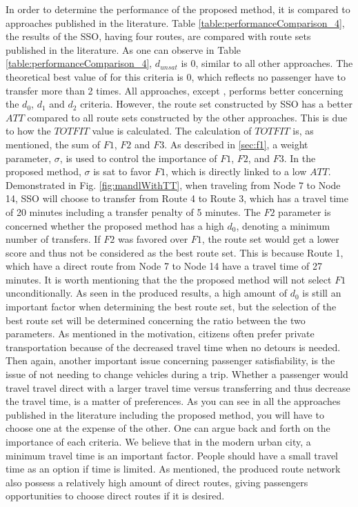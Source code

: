 In order to determine the performance of the proposed method, it is compared to approaches published in the literature. Table \vref{table:performanceComparison_4}, the results of the SSO, having four routes, are compared with route sets published in the literature. As one can observe in Table \vref{table:performanceComparison_4},  $d_{unsat}$ is 0, similar to all other approaches. The theoretical best value of for this criteria is 0, which reflects no passenger have to transfer more than 2 times. All approaches, except \citep{mandl79, kidwai98, chakroborty02}, performs better concerning the $d_0$, $d_1$ and $d_2$ criteria. However, the route set constructed by SSO has a better $ATT$ compared to all route sets constructed by the other approaches. This is due to how the $TOTFIT$ value is calculated. The calculation of $TOTFIT$ is, as mentioned, the sum of $F1$, $F2$ and $F3$. As described in \vref{sec:f1}, a weight parameter, $\sigma$, is used to control the importance of $F1$, $F2$, and $F3$. In the proposed method, $\sigma$ is sat to favor $F1$, which is directly linked to a low $ATT$. Demonstrated in Fig. \vref{fig:mandlWithTT}, when traveling from Node 7 to Node 14, SSO will choose to transfer from Route 4 to Route 3, which has a travel time of 20 minutes including a transfer penalty of 5 minutes. The $F2$ parameter is concerned whether the proposed method has a high $d_0$, denoting a minimum number of transfers. If $F2$ was favored over $F1$, the route set would get a lower score and thus not be considered as the best route set. This is because Route 1, which have a direct route from Node 7 to Node 14 have a travel time of 27 minutes. It is worth mentioning that the the proposed method will not select $F1$ unconditionally. As seen in the produced results, a high amount of $d_0$ is still an important factor when determining the best route set, but the selection of the best route set will be determined concerning the ratio between the two parameters. As mentioned in the motivation, citizens often prefer private transportation because of the decreased travel time when no detours is needed. Then again, another important issue concerning passenger satisfiability, is the issue of not needing to change vehicles during a trip. Whether a passenger would travel travel direct with a larger travel time versus transferring and thus decrease the travel time, is a matter of preferences. As you can see in all the approaches published in the literature including the proposed method, you will have to choose one at the expense of the other. One can argue back and forth on the importance of each criteria. We believe that in the modern urban city, a minimum travel time is an important factor. People should have a small travel time as an option if time is limited. As mentioned, the produced route network also possess a relatively high amount of direct routes, giving passengers opportunities to choose direct routes if it is desired. %

